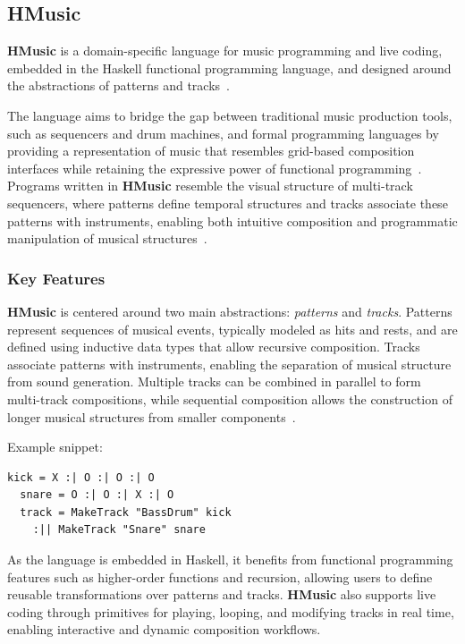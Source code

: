 \subsection{HMusic}\label{subsec:hmusic}

\textbf{HMusic} is a domain-specific language for music programming and live coding, embedded in the Haskell functional
programming language, and designed around the abstractions of patterns and tracks~\cite{Du_Bois_Ribeiro_2019}.

The language aims to bridge the gap between traditional music production tools, such as sequencers and drum machines,
and formal programming languages by providing a representation of music that resembles grid-based composition interfaces
while retaining the expressive power of functional programming~\cite{Du_Bois_Ribeiro_2019}.
Programs written in \textbf{HMusic} resemble the visual structure of multi-track sequencers, where patterns define
temporal structures and tracks associate these patterns with instruments, enabling both intuitive composition and
programmatic manipulation of musical structures~\cite{Du_Bois_Ribeiro_2019}.


\subsubsection{Key Features}

\textbf{HMusic} is centered around two main abstractions: \textit{patterns} and \textit{tracks}.
Patterns represent sequences of musical events, typically modeled as hits and rests, and are defined using
inductive data types that allow recursive composition.
Tracks associate patterns with instruments, enabling the separation of musical structure from sound generation.
Multiple tracks can be combined in parallel to form multi-track compositions, while sequential composition allows
the construction of longer musical structures from smaller components~\cite{Du_Bois_Ribeiro_2019}.

Example snippet:

\begin{lstlisting}[label={lst:hmusic-1}]
  kick = X :| O :| O :| O
  snare = O :| O :| X :| O
  track = MakeTrack "BassDrum" kick
    :|| MakeTrack "Snare" snare
\end{lstlisting}

As the language is embedded in Haskell, it benefits from functional programming features such as higher-order functions
and recursion, allowing users to define reusable transformations over patterns and tracks.
\textbf{HMusic} also supports live coding through primitives for playing, looping, and modifying tracks in real time,
enabling interactive and dynamic composition workflows.

